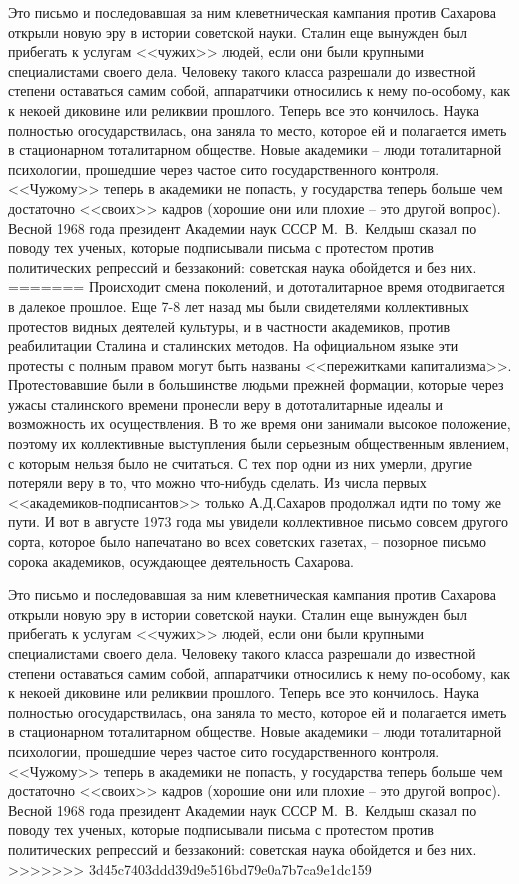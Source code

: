 \documentclass{book}
\begin{document}
Это письмо и последовавшая за ним клеветническая кампания против Сахарова открыли новую эру в истории советской науки. Сталин еще вынужден был прибегать к услугам <<чужих>> людей, если они были крупными специалистами своего дела. Человеку такого класса разрешали до известной степени оставаться самим собой, аппаратчики относились к нему по‑особому, как к некоей диковине или реликвии прошлого. Теперь все это кончилось. Наука полностью огосударствилась, она заняла то место, которое ей и полагается иметь в стационарном тоталитарном обществе. Новые академики -- люди тоталитарной психологии, прошедшие через частое сито государственного контроля. <<Чужому>> теперь в академики не попасть, у государства теперь больше чем достаточно <<своих>> кадров (хорошие они или плохие -- это другой вопрос). Весной 1968 года президент Академии наук СССР М.~В.~Келдыш сказал по поводу тех ученых, которые подписывали письма с протестом против политических репрессий и беззаконий: советская наука обойдется и без них.
=======
Происходит смена поколений, и дототалитарное время отодвигается в далекое прошлое. Еще 7-8 лет назад мы были свидетелями 
коллективных протестов видных деятелей культуры, и в частности академиков, против реабилитации Сталина и сталинских методов. На 
официальном языке эти протесты с полным правом могут быть названы <<пережитками капитализма>>. Протестовавшие были в большинстве 
людьми прежней формации, которые через ужасы сталинского времени пронесли веру в дототалитарные идеалы и возможность их 
осуществления. В то же время они занимали высокое положение, поэтому их коллективные выступления были серьезным общественным 
явлением, с которым нельзя было не считаться. С тех пор одни из них умерли, другие потеряли веру в то, что можно что-нибудь 
сделать. Из числа первых <<академиков-подписантов>> только А.Д.Сахаров продолжал идти по тому же пути. И вот в августе 1973 года 
мы увидели коллективное письмо совсем другого сорта, которое было напечатано во всех советских газетах, -- позорное письмо 
сорока академиков, осуждающее деятельность Сахарова.

Это письмо и последовавшая за ним клеветническая кампания против Сахарова открыли новую эру в истории советской науки. Сталин еще вынужден был прибегать к услугам <<чужих>> людей, если они были крупными специалистами своего дела. Человеку такого класса разрешали до известной степени оставаться самим собой, аппаратчики относились к нему по-особому, как к некоей диковине или реликвии прошлого. Теперь все это кончилось. Наука полностью огосударствилась, она заняла то место, которое ей и полагается иметь в стационарном тоталитарном обществе. Новые академики -- люди тоталитарной психологии, прошедшие через частое сито государственного контроля. <<Чужому>> теперь в академики не попасть, у государства теперь больше чем достаточно <<своих>> кадров (хорошие они или плохие -- это другой вопрос). Весной 1968 года президент Академии наук СССР М.~В.~Келдыш сказал по поводу тех ученых, которые подписывали письма с протестом против политических репрессий и беззаконий: советская наука обойдется и без них.
>>>>>>> 3d45c7403ddd39d9e516bd79e0a7b7ca9e1dc159
\end{document}
